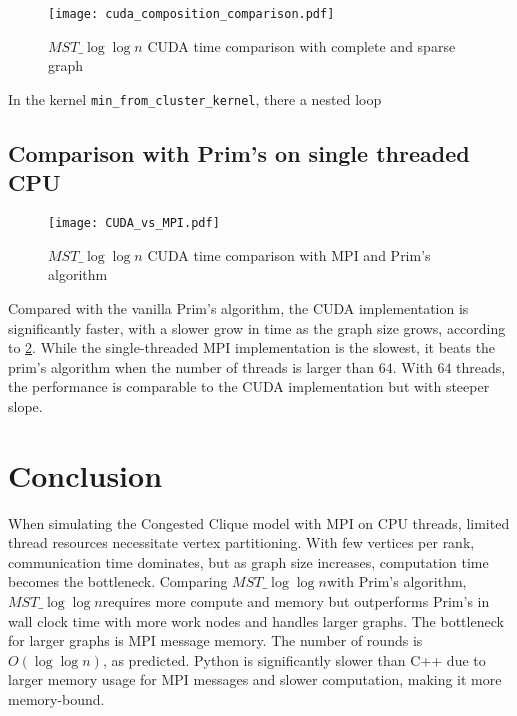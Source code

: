 \documentclass[english, 12pt, a4paper, elec, utf8, a-2b, online]{aaltothesis}
\newcommand{\mstalgo}{$MST\_\log\log{n}$}
\begin{document}
\begin{figure}[h]
	\centering
		\texttt{[image: cuda\_composition\_comparison.pdf]}
	\caption{\mstalgo{} CUDA time comparison with complete and sparse graph}
	\label{fig:cuda_composition_comparison.pdf}
\end{figure}

In the kernel \texttt{min\_from\_cluster\_kernel}, there a nested loop




\subsection{Comparison with Prim's on single threaded CPU}
\begin{figure}[h]
	\centering
		\texttt{[image: CUDA\_vs\_MPI.pdf]}
	\caption{\mstalgo{} CUDA time comparison with MPI and Prim's algorithm}
	\label{fig:CUDA_vs_MPI.pdf}
\end{figure}

Compared with the vanilla Prim's algorithm, the CUDA implementation is significantly faster, with a slower grow in time as the graph size grows, according to \cref{fig:CUDA_vs_MPI.pdf}. While the single-threaded MPI implementation is the slowest, it beats the prim's algorithm when the number of threads is larger than $64$. With $64$ threads, the performance is comparable to the CUDA implementation but with steeper slope.
\clearpage
\section{Conclusion}
\label{sec:conclusion}
When simulating the Congested Clique model with MPI on CPU threads, limited thread resources necessitate vertex partitioning. With few vertices per rank, communication time dominates, but as graph size increases, computation time becomes the bottleneck. Comparing \mstalgo with Prim's algorithm, \mstalgo requires more compute and memory but outperforms Prim's in wall clock time with more work nodes and handles larger graphs. The bottleneck for larger graphs is MPI message memory. The number of rounds is $O(\log{\log{n}})$, as predicted. Python is significantly slower than C++ due to larger memory usage for MPI messages and slower computation, making it more memory-bound.
\end{document}
